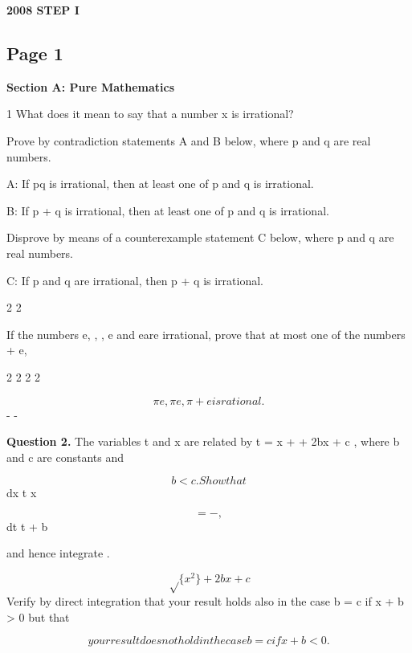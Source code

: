 \documentclass[12pt]{article}
\begin{document}
\begin{center}
{\Large \textbf{2008 STEP I}}
\end{center}

\subsection*{Page 1}
\begin{flushleft}
\bigskip\textbf{Section A: Pure Mathematics}\par
1 What does it mean to say that a number x is irrational?\par
Prove by contradiction statements A and B below, where p and q are real numbers.\par
A: If pq is irrational, then at least one of p and q is irrational.\par
B: If p + q is irrational, then at least one of p and q is irrational.\par
Disprove by means of a counterexample statement C below, where p and q are real numbers.\par
C: If p and q are irrational, then p + q is irrational.\par
2 2\par
If the numbers e, \pi, \pi , e and e\pi are irrational, prove that at most one of the numbers \pi + e,\par
2 2 2 2\par
\[\pi e, \pi e , \pi + e is rational.\]
- -\par
\bigskip\textbf{Question 2.} The variables t and x are related by t = x +  + 2bx + c , where b and c are constants and\par
\[b < c. Show that\]
dx t x\par
\[= - ,\]
dt t + b\par
and hence integrate .\par
\[\sqrt\{x^2\} + 2bx + c\]
Verify by direct integration that your result holds also in the case b = c if x + b > 0 but that\par
\[your result does not hold in the case b = c if x + b < 0 .\]
\end{flushleft}
\end{document}
